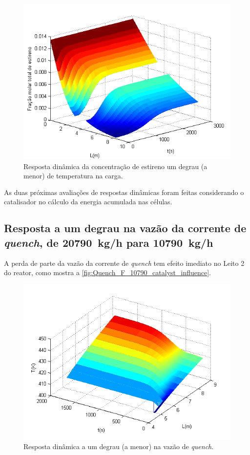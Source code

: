 \begin{figure}[htb]
\centering
\includegraphics[scale=0.8]{images/Chap4/Feed_T_300K_catalyst_influence_styrene.png}
\caption{Resposta dinâmica da concentração de estireno um degrau (a menor) de
temperatura na carga.}
\label{fig:Feed_T_300K_catalyst_influence_styrene}
\end{figure}

As duas próximas avaliações de respostas dinâmicas foram feitas considerando o
catalisador no cálculo da energia acumulada nas células.

\subsection{Resposta a um degrau na vazão da corrente de \emph{quench}, de
\SI{20790}{kg/h} para \SI{10790}{kg/h}}
\label{sec:respostaaumdegrauvazao1}

A perda de parte da vazão da corrente de \emph{quench} tem efeito imediato no
Leito 2 do reator, como mostra a \autoref{fig:Quench_F_10790_catalyst_influence}.

\begin{figure}[htb]
\centering
\includegraphics[scale=0.8]{images/Chap4/Quench_F_10790_catalyst_influence.png}
\caption{Resposta dinâmica a um degrau (a menor) na vazão de \emph{quench}.}
\label{fig:Quench_F_10790_catalyst_influence}
\end{figure}

